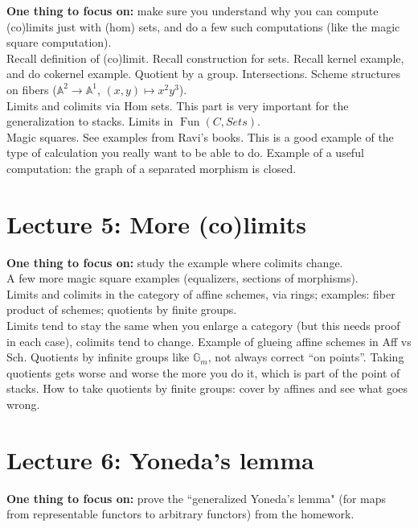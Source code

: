 \documentclass[12pt]{article}
\newcommand{\A}{{\mathbb A}}
\DeclareMathOperator{\Fun}{Fun}
\begin{document}
\textbf{One thing to focus on:} make sure you understand why you can compute (co)limits just with (hom) sets, and do a few such computations (like the magic square computation).
\\

Recall definition of (co)limit. Recall construction for sets. Recall kernel example, and do cokernel example.  Quotient by a group. Intersections. Scheme structures on fibers ($\A^2 \to \A^1$, $(x,y) \mapsto x^2 y^3$).
\\

Limits and colimits via Hom sets. This part is very important for the generalization to stacks. Limits in $\Fun(C,Sets)$.
\\

Magic squares. See examples from Ravi's books. This is a good example of the type of calculation you really want to be able to do. Example of a useful computation: the graph of a separated morphism is closed.
\\

\newpage
\section{Lecture 5: More (co)limits}
\textbf{One thing to focus on:} study the example where colimits change.
\\

A few more magic square examples (equalizers, sections of morphisms).
\\


Limits and colimits in the category of affine schemes, via rings; examples: fiber product of schemes; quotients by finite groups.
\\

Limits tend to stay the same when you enlarge a category (but this needs proof in each case), colimits tend to change. Example of glueing affine schemes in Aff vs Sch. Quotients by infinite groups like $\mathbb{G}_m$, not always correct ``on points''. Taking quotients gets worse and worse the more you do it, which is part of the point of stacks. How to take quotients by finite groups: cover by affines and see what goes wrong.
\\


\newpage
\section{Lecture 6: Yoneda's lemma}
\textbf{One thing to focus on:} prove the ``generalized Yoneda's lemma" (for maps from representable functors to arbitrary functors) from the homework. 
\\
\end{document}
